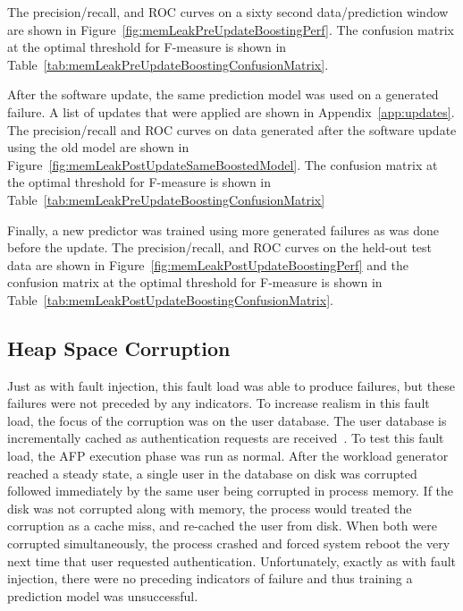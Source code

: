 The precision/recall, and \ac{ROC} curves on a sixty second data/prediction
window are shown in Figure~\ref{fig:memLeakPreUpdateBoostingPerf}.  The
confusion matrix at the optimal threshold for F-measure is shown in
Table~\ref{tab:memLeakPreUpdateBoostingConfusionMatrix}.

\figMemLeakPreUpdateBoostingPerf
\tabMemLeakPreUpdateBoostingConfusionMatrix

After the software update, the same prediction model was used on a generated
failure.  A list of updates that were applied are shown in
Appendix~\ref{app:updates}.  The precision/recall and \ac{ROC} curves on data
generated after the software update using the old model are shown in
Figure~\ref{fig:memLeakPostUpdateSameBoostedModel}.  The confusion matrix at
the optimal threshold for F-measure is shown in
Table~\ref{tab:memLeakPreUpdateBoostingConfusionMatrix}

\figMemLeakPostUpdateSameBoostedModel
\tabMemLeakPostUpdateBoostingSameModelConfusionMatrix

Finally, a new predictor was trained using more generated failures as was done
before the update.  The precision/recall, and \ac{ROC} curves on the held-out
test data are shown in Figure~\ref{fig:memLeakPostUpdateBoostingPerf} and the
confusion matrix at the optimal threshold for F-measure is shown in
Table~\ref{tab:memLeakPostUpdateBoostingConfusionMatrix}.

\figMemLeakPostUpdateBoostingPerf
\tabMemLeakPostUpdateBoostingConfusionMatrix

\subsection{Heap Space Corruption}
Just as with fault injection, this fault load was able to produce failures, but
these failures were not preceded by any indicators.  To increase realism in
this fault load, the focus of the corruption was on the user database.  The user
database is incrementally cached as authentication requests are
received~\cite{russinovich2009}.  To test this fault load, the \ac{AFP}
execution phase was run as normal.  After the workload generator reached a
steady state, a single user in the database on disk was corrupted followed
immediately by the same user being corrupted in process memory.  If the disk
was not corrupted along with memory, the process would treated the
corruption as a cache miss, and re-cached the user from disk.  When both were
corrupted simultaneously, the process crashed and forced system reboot the very
next time that user requested authentication.  Unfortunately, exactly as with
fault injection, there were no preceding indicators of failure and thus
training a prediction model was unsuccessful.

